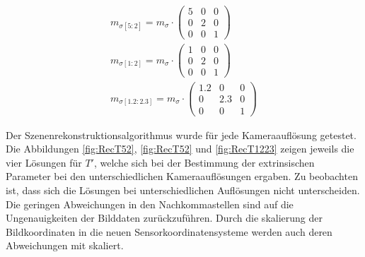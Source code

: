\begin{gather}
	m_{\sigma[5:2]}=
m_\sigma \cdot
\begin{pmatrix}
	5&0&0\\
	0&2&0\\
	0&0&1	
\end{pmatrix}\\
	m_{\sigma[1:2]}=
m_\sigma \cdot
\begin{pmatrix}
	1&0&0\\
	0&2&0\\
	0&0&1	
\end{pmatrix}\\
	m_{\sigma[1.2:2.3]}=
m_\sigma \cdot
\begin{pmatrix}
	1.2&0&0\\
	0&2.3&0\\
	0&0&1	
\end{pmatrix}
\end{gather}


Der Szenenrekonstruktionsalgorithmus wurde für jede Kameraauflösung getestet. Die Abbildungen \ref{fig:RecT52}, \ref{fig:RecT52} und \ref{fig:RecT1223} zeigen jeweils die vier Lösungen für $T'$, welche sich bei der Bestimmung der extrinsischen Parameter bei den unterschiedlichen Kameraauflösungen ergaben. Zu beobachten ist, dass sich die Lösungen bei unterschiedlichen Auflösungen nicht unterscheiden. Die geringen Abweichungen in den Nachkommastellen sind auf die Ungenauigkeiten der Bilddaten zurückzuführen. Durch die skalierung der Bildkoordinaten in die neuen Sensorkoordinatensysteme werden auch deren Abweichungen mit skaliert. 

%
%




